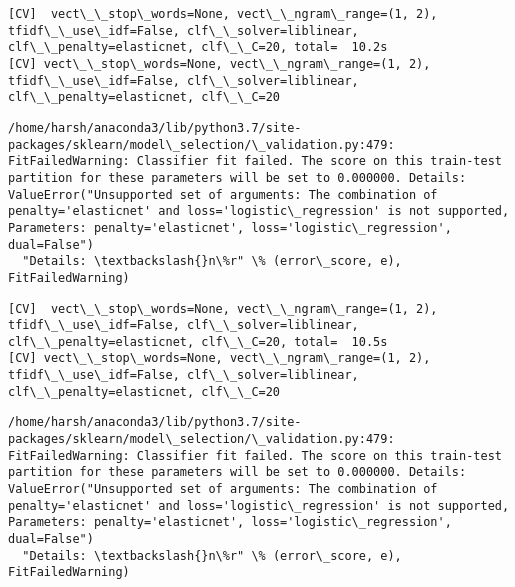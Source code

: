 \documentclass[11pt]{article}
\begin{document}
    \begin{Verbatim}[commandchars=\\\{\}]
[CV]  vect\_\_stop\_words=None, vect\_\_ngram\_range=(1, 2), tfidf\_\_use\_idf=False, clf\_\_solver=liblinear, clf\_\_penalty=elasticnet, clf\_\_C=20, total=  10.2s
[CV] vect\_\_stop\_words=None, vect\_\_ngram\_range=(1, 2), tfidf\_\_use\_idf=False, clf\_\_solver=liblinear, clf\_\_penalty=elasticnet, clf\_\_C=20 

    \end{Verbatim}

    \begin{Verbatim}[commandchars=\\\{\}]
/home/harsh/anaconda3/lib/python3.7/site-packages/sklearn/model\_selection/\_validation.py:479: FitFailedWarning: Classifier fit failed. The score on this train-test partition for these parameters will be set to 0.000000. Details: 
ValueError("Unsupported set of arguments: The combination of penalty='elasticnet' and loss='logistic\_regression' is not supported, Parameters: penalty='elasticnet', loss='logistic\_regression', dual=False")
  "Details: \textbackslash{}n\%r" \% (error\_score, e), FitFailedWarning)

    \end{Verbatim}

    \begin{Verbatim}[commandchars=\\\{\}]
[CV]  vect\_\_stop\_words=None, vect\_\_ngram\_range=(1, 2), tfidf\_\_use\_idf=False, clf\_\_solver=liblinear, clf\_\_penalty=elasticnet, clf\_\_C=20, total=  10.5s
[CV] vect\_\_stop\_words=None, vect\_\_ngram\_range=(1, 2), tfidf\_\_use\_idf=False, clf\_\_solver=liblinear, clf\_\_penalty=elasticnet, clf\_\_C=20 

    \end{Verbatim}

    \begin{Verbatim}[commandchars=\\\{\}]
/home/harsh/anaconda3/lib/python3.7/site-packages/sklearn/model\_selection/\_validation.py:479: FitFailedWarning: Classifier fit failed. The score on this train-test partition for these parameters will be set to 0.000000. Details: 
ValueError("Unsupported set of arguments: The combination of penalty='elasticnet' and loss='logistic\_regression' is not supported, Parameters: penalty='elasticnet', loss='logistic\_regression', dual=False")
  "Details: \textbackslash{}n\%r" \% (error\_score, e), FitFailedWarning)

    \end{Verbatim}
\end{document}
